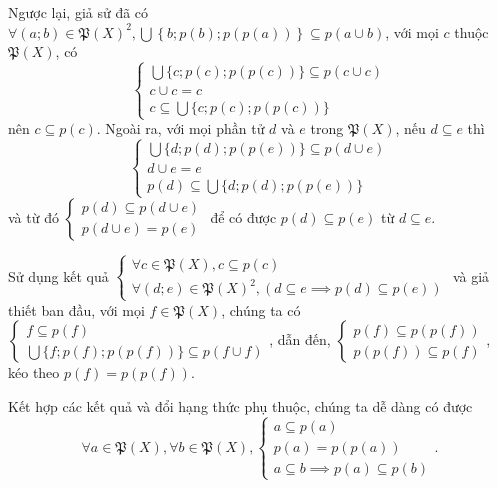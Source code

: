Ngược lại, giả sử đã có $\forall (a; b) \in \mathfrak{P}(X)^2, \bigcup\left\{b; p(b); p(p(a))\right\} \subseteq p(a \cup b)$, với mọi $c$ thuộc $\mathfrak{P}(X)$, có
$$\begin{cases}
   \bigcup \{c; p(c); p(p(c))\} \subseteq p(c \cup c) \\
   c \cup c = c \\
   c \subseteq \bigcup \{c; p(c); p(p(c))\}
\end{cases}$$ nên $c \subseteq p(c)$. Ngoài ra, với mọi phần tử $d$ và $e$ trong $\mathfrak{P}(X)$, nếu $d \subseteq e$ thì $$
\begin{cases}
   \bigcup \{d; p(d); p(p(e))\} \subseteq p(d \cup e) \\
   d \cup e = e \\
   p(d) \subseteq \bigcup \{d; p(d); p(p(e))\}
\end{cases}
$$ và từ đó $\begin{cases}
   p(d) \subseteq p(d \cup e) \\
   p(d \cup e) = p(e)
\end{cases}$ để có được $p(d) \subseteq p(e)$ từ $d \subseteq e$.

Sử dụng kết quả $\begin{cases}
   \forall c \in \mathfrak{P}(X), c \subseteq p(c) \\
   \forall (d; e) \in \mathfrak{P}(X)^2, (d \subseteq e \implies p(d) \subseteq p(e))
\end{cases}$ và giả thiết ban đầu, với mọi $f \in \mathfrak{P}(X)$, chúng ta có
$\begin{cases}
   f \subseteq p(f) \\
   \bigcup \{f; p(f); p(p(f))\} \subseteq p(f \cup f)
\end{cases}$, dẫn đến, $\begin{cases}
   p(f) \subseteq p(p(f)) \\
   p(p(f)) \subseteq p(f)
\end{cases}$, kéo theo $p(f) = p(p(f))$.

Kết hợp các kết quả và đổi hạng thức phụ thuộc, chúng ta dễ dàng có được \begin{equation*}
   \forall a \in \mathfrak{P}(X), \forall b \in \mathfrak{P}(X), \begin{cases}
      a \subseteq p(a) \\
      p(a) = p(p(a)) \\
      a \subseteq b \implies p(a) \subseteq p(b)
   \end{cases}.
\end{equation*}

